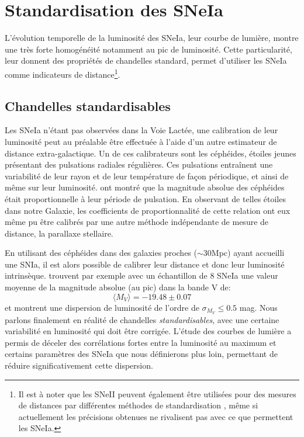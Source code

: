 \documentclass[../main/main.tex]{subfiles}
\begin{document}
\section{Standardisation des SNeIa}

L'évolution temporelle de la luminosité des SNeIa, leur courbe de
lumière, montre une très forte homogénéité notamment au pic de
luminosité. Cette particularité, leur donnent des propriétés de
chandelles standard, permet d'utiliser les SNeIa comme
indicateurs de distance\footnote{Il est à noter que les SNeII peuvent également
être utilisées pour des mesures de distances par différentes méthodes de
standardisation \citep{Jaeger2020}, même si actuellement les précisions
obtenues ne rivalisent pas avec ce que permettent les
SNeIa.}.

\subsection{Chandelles standardisables}
Les SNeIa n'étant pas observées dans la Voie Lactée, une calibration
de leur luminosité peut au préalable être effectuée à l'aide d'un autre estimateur de
distance extra-galactique.
Un de ces calibrateurs sont les céphéides, étoiles jeunes présentant des
pulsations radiales régulières. Ces pulsations entraînent une
variabilité de leur rayon et de leur température de façon périodique, et
ainsi de même sur leur luminosité. \citet{Leavitt1908, Leavitt1912} ont
montré que la magnitude absolue des céphéides était
proportionnelle à leur période de pulsation. En observant de telles
étoiles dans notre Galaxie, les coefficients de proportionnalité de
cette relation ont eux même pu être calibrés par une autre méthode indépendante
de mesure de distance, la parallaxe stellaire.

En utilisant des céphéides dans des galaxies proches
($\sim30$Mpc) ayant accueilli une SNIa, il est alors possible de
calibrer leur distance et donc leur luminosité
intrinsèque. \citet{Saha1999} trouvent par exemple avec un échantillon
de $8$ SNeIa une valeur moyenne de
la magnitude absolue (au pic) dans la bande V de:
\begin{equation}
  \label{eq:51}
  \langle M_{V}\rangle=-19.48\pm0.07 
\end{equation}
et \citet{Hamuy1995} montrent une
dispersion de luminosité de l'ordre de $\sigma_{M_{V}}\leq0.5$ mag.
Nous parlons finalement en réalité de chandelles \textit{standardisables}, avec une
certaine variabilité en luminosité qui doit être corrigée. L'étude des
courbes de lumière a permis de déceler des corrélations fortes entre la
luminosité au maximum et certains paramètres des SNeIa que nous
définierons plus loin, permettant
de réduire significativement cette dispersion. 
\end{document}
